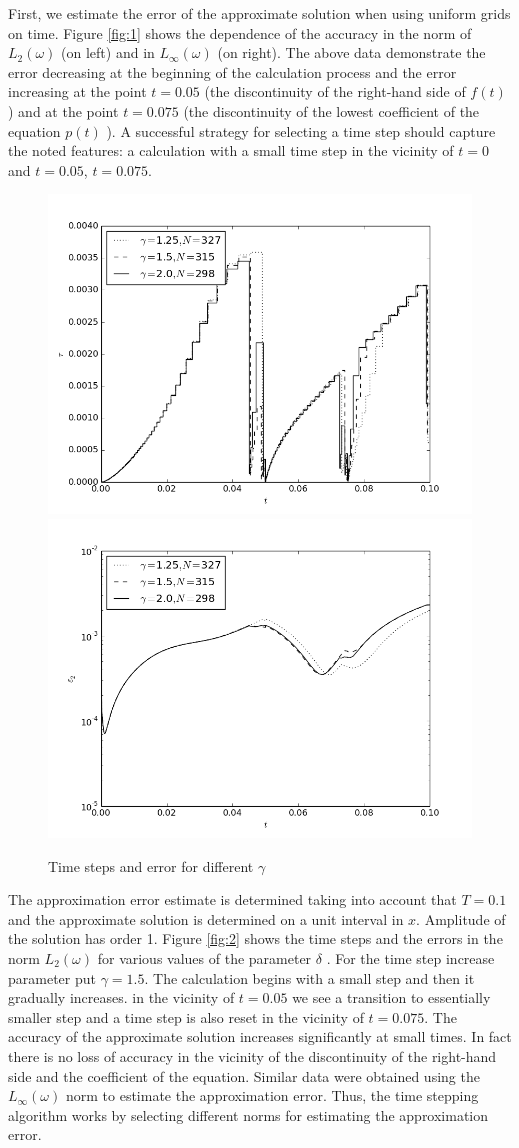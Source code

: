 \documentclass{aip-cp}
\begin{document}
First, we estimate the error of the approximate solution when using uniform grids on time. 
Figure \ref{fig:1} shows the dependence of the accuracy in the norm of $L_2(\omega)$ (on left) and in $L_\infty(\omega)$ (on right).
The above data demonstrate the error decreasing at the beginning of the calculation process and the error increasing at the point $t=0.05$ (the discontinuity of the right-hand side of $f(t)$) and at the point $t=0.075$ (the discontinuity of the lowest coefficient of the equation $p(t)$ ).
A successful strategy for selecting a time step should capture the noted features: a calculation with a small time step in the vicinity of $t=0$ and  $t=0.05$, $t=0.075$.

\begin{figure}[h]
    \includegraphics[width=0.5\linewidth] {art/3-1.png}
    \includegraphics[width=0.5\linewidth] {art/3-2.png}
	\caption{Time steps and error for different $\gamma$}
	\label{fig:3}
\end{figure} 

The approximation error estimate is determined taking into account that $T=0.1$ and the approximate solution is determined on a unit interval in $x$. Amplitude of the solution has order 1.
Figure \ref{fig:2} shows the time steps and the errors in the norm $L_2(\omega)$  for various values of the parameter $\delta$ .
For the time step increase parameter put $\gamma=1.5$.
The calculation begins with a small step and then it gradually increases.
in the vicinity of $t=0.05$ we see a transition to essentially smaller step and a time step is also reset in the vicinity of $t=0.075$.
The accuracy of the approximate solution increases significantly at small times. In fact there is no loss of accuracy in the vicinity of the discontinuity of the right-hand side and the coefficient of the equation.
Similar data were obtained using the $L_\infty(\omega) $ norm to estimate the approximation error.
Thus, the time stepping algorithm works by selecting different norms for estimating the approximation error.
\end{document}
